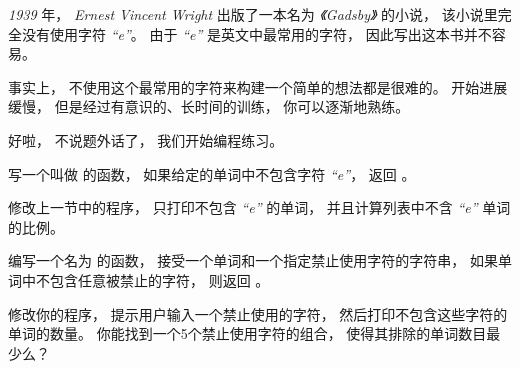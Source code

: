 \begin{exercise}


{\em 1939} 年， {\em Ernest Vincent Wright} 出版了一本名为 {\em 《Gadsby》} 的小说，
该小说里完全没有使用字符 {\em ``e''}。   由于 {\em ``e''} 是英文中最常用的字符， 因此写出这本书并不容易。


事实上， 不使用这个最常用的字符来构建一个简单的想法都是很难的。
开始进展缓慢， 但是经过有意识的、长时间的训练， 你可以逐渐地熟练。


好啦， 不说题外话了， 我们开始编程练习。


写一个叫做 {\em {}} 的函数， 如果给定的单词中不包含字符 {\em ``e''}， 返回 {\em {}} 。


修改上一节中的程序， 只打印不包含 {\em ``e''} 的单词， 并且计算列表中不含 {\em ``e''} 单词的比例。

\end{exercise}


\begin{exercise}


编写一个名为 {\em {}} 的函数， 接受一个单词和一个指定禁止使用字符的字符串，
如果单词中不包含任意被禁止的字符， 则返回 {\em {}} 。


修改你的程序， 提示用户输入一个禁止使用的字符， 然后打印不包含这些字符的单词的数量。
你能找到一个5个禁止使用字符的组合， 使得其排除的单词数目最少么？

\end{exercise}



